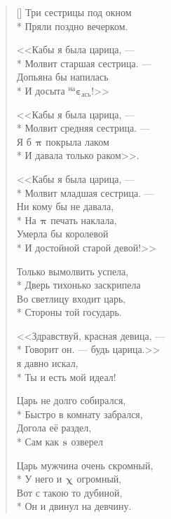 \documentclass[a4paper,oneside,14pt]{scrbook}
\newcommand{\myPiz}[2]{$^{\text{#1}}${\large{$\boldsymbol{\pi}$}}$_{\text{#2}}$}
\newcommand{\myEbt}[2]{$^{\text{#1}}${\large{$\boldsymbol{\varepsilon}$}}$_{\text{#2}}$}
\newcommand{\myXyi}[2]{$^{\text{#1}}${\large{$\boldsymbol{\chi}$}}$_{\text{#2}}$}
\newcommand{\mySuk}[2]{$^{\text{#1}}${\large{$\boldsymbol{s}$}}$_{\text{#2}}$}
\newcommand{\myCel}[2]{$^{\text{#1}}${\large{$\boldsymbol{\lceil\varnothing\rceil}$}}$_{\text{#2}}$}
\begin{document}
    \settowidth{\versewidth}{Три сестрицы под окном}
    \begin{verse}[\versewidth]
        Три сестрицы под окном\\*
        Пряли поздно вечерком.
        
        \vin <<Кабы я была царица, --- \\*
        \vin Молвит старшая сестрица. ---\\ 
        \vin Допьяна бы напилась\\*
        \vin И досыта {\myEbt{на}{ась}}!>>
        
        <<Кабы я была царица, ---\\*
        Молвит средняя сестрица. ---\\
        Я б {\myPiz{}{}} покрыла лаком\\*
        И давала только раком>>.
        
        \vin <<Кабы я была царица, ---\\*
        \vin Молвит младшая сестрица. ---\\
        \vin Ни кому бы не давала,\\*
        \vin На {\myPiz{}{}} печать наклала,\\
        \vin Умерла бы королевой\\*
        \vin И достойной старой девой!>>
        
        Только вымолвить успела,\\*
        Дверь тихонько заскрипела\\
        Во светлицу входит царь,\\*
        Стороны той государь.
        
        \vin <<Здравствуй, красная девица, ---\\*
        \vin Говорит он. --- будь царица.>>\\
        \vin {\myCel{}{у}} я давно искал,\\*
        \vin Ты и есть мой идеал!
        
        Царь не долго собирался,\\*
        Быстро в комнату забрался,\\
        Догола её раздел,\\*
        Сам как {\mySuk{}{}} озверел
        
        \vin Царь мужчина очень скромный,\\*
        \vin У него и {\myXyi{}{}} огромный,\\
        \vin Вот с такою то дубиной,\\*
        \vin Он и двинул на девчину.
        

\end{verse}
\end{document}
